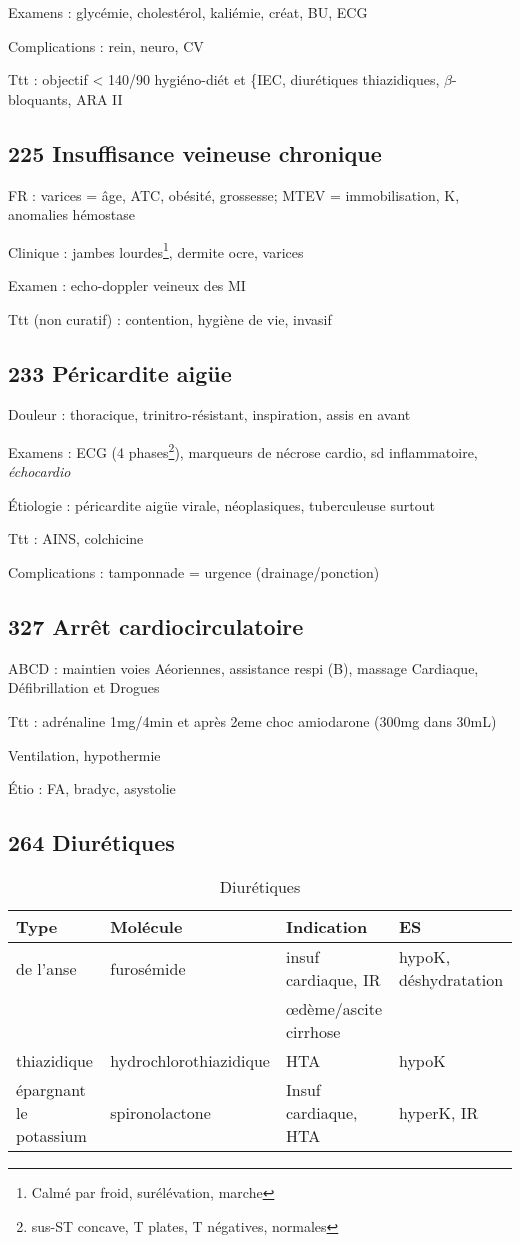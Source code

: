 \documentclass[11pt]{article}
\begin{document}
Examens : glycémie, cholestérol, kaliémie, créat, BU, ECG

Complications : rein, neuro, CV

Ttt : objectif < 140/90 \thus hygiéno-diét et \{IEC, diurétiques thiazidiques, \(\beta\)-bloquants, ARA II
\subsection{225 Insuffisance veineuse chronique}
\label{sec:orgad66ae8}
FR : varices = âge, ATC, obésité, grossesse; MTEV = immobilisation, K, anomalies hémostase

Clinique : jambes lourdes\footnote{Calmé par froid, surélévation, marche}, dermite ocre, varices

Examen : echo-doppler veineux des MI   

Ttt (non curatif) : contention, hygiène de vie, invasif
\subsection{233 Péricardite aigüe}
\label{sec:orgd0cd9f6}
Douleur : thoracique, trinitro-résistant, \inc inspiration, \dec assis en avant

Examens : ECG (4 phases\footnote{sus-ST concave, T plates, T négatives, normales}), marqueurs de nécrose cardio, sd inflammatoire, \emph{échocardio}

Étiologie : péricardite aigüe virale, néoplasiques, tuberculeuse surtout

Ttt : AINS, colchicine

Complications : tamponnade = urgence  (drainage/ponction)
\subsection{327 Arrêt cardiocirculatoire}
\label{sec:org6e7212a}
ABCD : maintien voies Aéoriennes, assistance respi (B), massage Cardiaque,
Défibrillation et Drogues

Ttt : adrénaline 1mg/4min et après 2eme choc amiodarone (300mg dans 30mL)

Ventilation, hypothermie

Étio : FA, bradyc, asystolie
\subsection{264 Diurétiques}
\label{sec:orge340436}
\begin{table}[htbp]
\caption{Diurétiques}
\centering
\begin{tabular}{llll}
Type & Molécule & Indication & ES\\
\hline
de l'anse & furosémide & insuf cardiaque, IR & hypoK, déshydratation\\
 &  & \oe{}dème/ascite cirrhose & \\
thiazidique & hydrochlorothiazidique & HTA & hypoK\\
épargnant le potassium & spironolactone & Insuf cardiaque, HTA & hyperK, IR\\
\end{tabular}
\end{table}
\end{document}
